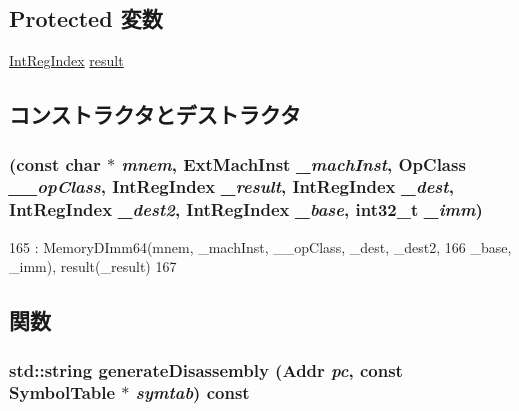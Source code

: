 \subsection*{Protected 変数}
\begin{DoxyCompactItemize}
\item 
\hyperlink{namespaceArmISA_ae64680ba9fb526106829d6bf92fc791b}{IntRegIndex} \hyperlink{classArmISA_1_1MemoryDImmEx64_a43f8ecc8130e5285e0ae2134151d6d6a}{result}
\end{DoxyCompactItemize}


\subsection{コンストラクタとデストラクタ}
\hypertarget{classArmISA_1_1MemoryDImmEx64_adf023173a245313ece4f1d6786897a94}{
\subsubsection[{MemoryDImmEx64}]{ (const char $\ast$ {\em mnem}, \/  {\bf ExtMachInst} {\em \_\-machInst}, \/  OpClass {\em \_\-\_\-opClass}, \/  {\bf IntRegIndex} {\em \_\-result}, \/  {\bf IntRegIndex} {\em \_\-dest}, \/  {\bf IntRegIndex} {\em \_\-dest2}, \/  {\bf IntRegIndex} {\em \_\-base}, \/  int32\_\-t {\em \_\-imm})}}
\label{classArmISA_1_1MemoryDImmEx64_adf023173a245313ece4f1d6786897a94}



\begin{DoxyCode}
165         : MemoryDImm64(mnem, _machInst, __opClass, _dest, _dest2,
166                      _base, _imm), result(_result)
167     {}
\end{DoxyCode}


\subsection{関数}
\hypertarget{classArmISA_1_1MemoryDImmEx64_a95d323a22a5f07e14d6b4c9385a91896}{
\subsubsection[{generateDisassembly}]{\setlength{\rightskip}{0pt plus 5cm}std::string generateDisassembly ({\bf Addr} {\em pc}, \/  const SymbolTable $\ast$ {\em symtab}) const}}
\label{classArmISA_1_1MemoryDImmEx64_a95d323a22a5f07e14d6b4c9385a91896}


